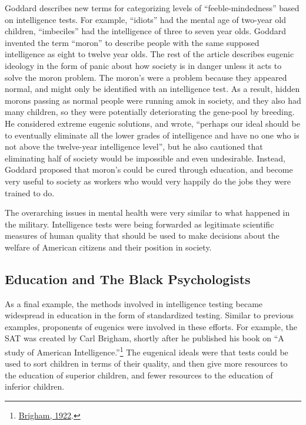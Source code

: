 \documentclass[
  oneside,
  12pt]{crumpbook}
\begin{document}
Goddard describes new terms for categorizing levels of ``feeble-mindedness'' based on intelligence tests. For example, ``idiots'' had the mental age of two-year old children, ``imbeciles'' had the intelligence of three to seven year olds. Goddard invented the term ``moron'' to describe people with the same supposed intelligence as eight to twelve year olds. The rest of the article describes eugenic ideology in the form of panic about how society is in danger unless it acts to solve the moron problem. The moron's were a problem because they appeared normal, and might only be identified with an intelligence test. As a result, hidden morons passing as normal people were running amok in society, and they also had many children, so they were potentially deteriorating the gene-pool by breeding. He considered extreme eugenic solutions, and wrote, ``perhaps our ideal should be to eventually eliminate all the lower grades of intelligence and have no one who is not above the twelve-year intelligence level'', but he also cautioned that eliminating half of society would be impossible and even undesirable. Instead, Goddard proposed that moron's could be cured through education, and become very useful to society as workers who would very happily do the jobs they were trained to do.

The overarching issues in mental health were very similar to what happened in the military. Intelligence tests were being forwarded as legitimate scientific measures of human quality that should be used to make decisions about the welfare of American citizens and their position in society.

\hypertarget{education-and-the-black-psychologists}{%
\subsection{Education and The Black Psychologists}\label{education-and-the-black-psychologists}}

As a final example, the methods involved in intelligence testing became widespread in education in the form of standardized testing. Similar to previous examples, proponents of eugenics were involved in these efforts. For example, the SAT was created by Carl Brigham, shortly after he published his book on ``A study of American Intelligence.''\footnote{\protect\hyperlink{ref-brighamStudyAmericanIntelligence1922}{Brigham, 1922}.} The eugenical ideals were that tests could be used to sort children in terms of their quality, and then give more resources to the education of superior children, and fewer resources to the education of inferior children.
\end{document}
